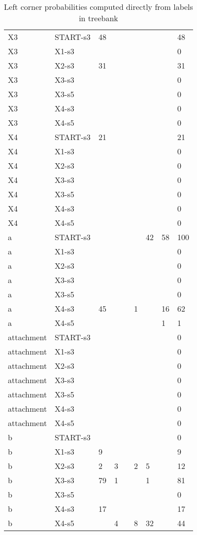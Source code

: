 \documentclass[10pt]{article}
\begin{document}
\begin{table}[htbp]
{\begin{tabular}[t]{lllllllll}
X3 & START-s3 & 48 &  &  &  &  &  & 48 \\ 
X3 & X1-s3 &  &  &  &  &  &  & 0 \\ 
X3 & X2-s3 & 31 &  &  &  &  &  & 31 \\ 
X3 & X3-s3 &  &  &  &  &  &  & 0 \\ 
X3 & X3-s5 &  &  &  &  &  &  & 0 \\ 
X3 & X4-s3 &  &  &  &  &  &  & 0 \\ 
X3 & X4-s5 &  &  &  &  &  &  & 0 \\ 
X4 & START-s3 & 21 &  &  &  &  &  & 21 \\ 
X4 & X1-s3 &  &  &  &  &  &  & 0 \\ 
X4 & X2-s3 &  &  &  &  &  &  & 0 \\ 
X4 & X3-s3 &  &  &  &  &  &  & 0 \\ 
X4 & X3-s5 &  &  &  &  &  &  & 0 \\ 
X4 & X4-s3 &  &  &  &  &  &  & 0 \\ 
X4 & X4-s5 &  &  &  &  &  &  & 0 \\ 
a & START-s3 &  &  &  &  & 42 & 58 & 100 \\ 
a & X1-s3 &  &  &  &  &  &  & 0 \\ 
a & X2-s3 &  &  &  &  &  &  & 0 \\ 
a & X3-s3 &  &  &  &  &  &  & 0 \\ 
a & X3-s5 &  &  &  &  &  &  & 0 \\ 
a & X4-s3 & 45 &  &  & 1 &  & 16 & 62 \\ 
a & X4-s5 &  &  &  &  &  & 1 & 1 \\ 
attachment & START-s3 &  &  &  &  &  &  & 0 \\ 
attachment & X1-s3 &  &  &  &  &  &  & 0 \\ 
attachment & X2-s3 &  &  &  &  &  &  & 0 \\ 
attachment & X3-s3 &  &  &  &  &  &  & 0 \\ 
attachment & X3-s5 &  &  &  &  &  &  & 0 \\ 
attachment & X4-s3 &  &  &  &  &  &  & 0 \\ 
attachment & X4-s5 &  &  &  &  &  &  & 0 \\ 
b & START-s3 &  &  &  &  &  &  & 0 \\ 
b & X1-s3 & 9 &  &  &  &  &  & 9 \\ 
b & X2-s3 & 2 & 3 &  & 2 & 5 &  & 12 \\ 
b & X3-s3 & 79 & 1 &  &  & 1 &  & 81 \\ 
b & X3-s5 &  &  &  &  &  &  & 0 \\ 
b & X4-s3 & 17 &  &  &  &  &  & 17 \\ 
b & X4-s5 &  & 4 &  & 8 & 32 &  & 44 \\ 
\hline
\end{tabular}}
\caption{Left corner probabilities computed directly from labels in treebank}
\label{tab:attach_project_probabilities}
\end{table}
\end{document}
